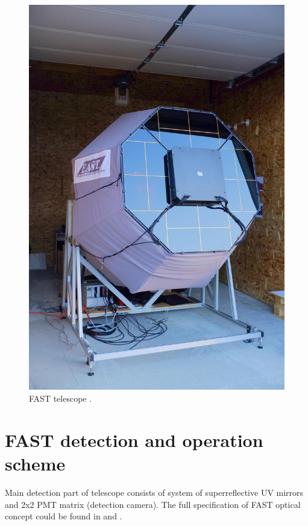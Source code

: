 \begin{figure}[H]
 \centering
 \includegraphics[scale = 0.2]{./pictures/FASTReal}
 \caption{FAST telescope \cite{Project}.}
 \label{FASThut}
 
\end{figure}
\section{FAST detection and operation scheme}
Main detection part of telescope consists of system of superreflective UV mirrors and 2x2 PMT matrix (detection camera). The full specification of FAST optical concept could be found in \cite{Mandat_2017} and \cite{MALACARI2020102430}.

